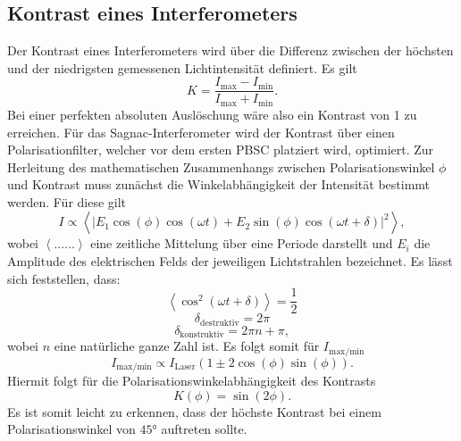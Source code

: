\subsection{Kontrast eines Interferometers}
Der Kontrast eines Interferometers wird über die  Differenz zwischen der höchsten und der niedrigsten gemessenen Lichtintensität definiert. Es gilt
\begin{equation}
  K=\frac{I_{\text{max}}-I_{\text{min}}}{I_{\text{max}}+I_{\text{min}}}.
  \label{eq:kontrast}
\end{equation}
Bei einer perfekten absoluten Auslöschung wäre also ein Kontrast von 1 zu erreichen. Für das Sagnac-Interferometer wird der Kontrast über einen Polarisationfilter, welcher vor dem ersten PBSC platziert
wird, optimiert. Zur Herleitung des mathematischen Zusammenhangs zwischen Polarisationswinkel $\phi$ und Kontrast muss zunächst die Winkelabhängigkeit der Intensität bestimmt werden.
Für diese gilt
\begin{equation}
I \propto \left<\left|E_1\cos{(\phi)}\cos{(\omega t)}+E_2\sin{(\phi)}\cos{(\omega t+\delta)}\right|^2\right> ,
\end{equation}
wobei $\left<......\right>$ eine zeitliche Mittelung über eine Periode darstellt und $E_i$ die Amplitude des elektrischen Felds der jeweiligen Lichtstrahlen bezeichnet.
Es lässt sich feststellen, dass:
\begin{equation}
  \left<\cos^2(\omega t +\delta)\right> = \frac{1}{2} \nonumber
\end{equation}
\begin{equation}
  \delta_{\text{destruktiv}}=2\pi  \nonumber
\end{equation}
\begin{equation}
  \delta_{\text{konstruktiv}}=2\pi n + \pi \nonumber ,
\end{equation}
wobei $n$ eine natürliche ganze Zahl ist. Es folgt somit für $I_{\text{max}/\text{min}}$
\begin{equation}
  I_{\text{max}/\text{min}} \propto I_{\text{Laser}}\left(1 \pm 2\cos(\phi)\sin(\phi)\right).
\end{equation}
Hiermit folgt für die Polarisationswinkelabhängigkeit des Kontrasts
\begin{equation}
  K(\phi)=\sin(2\phi).
\end{equation}
Es ist somit leicht zu erkennen, dass der höchste Kontrast bei einem Polarisationswinkel von $45°$ auftreten sollte.
